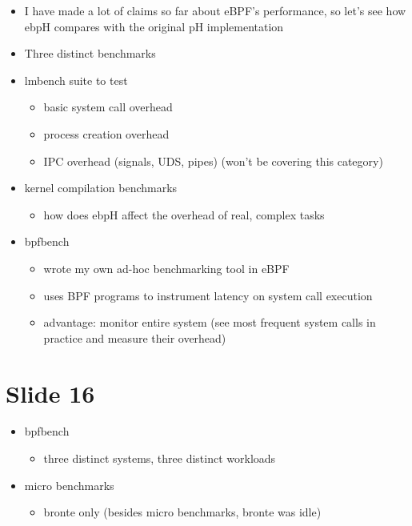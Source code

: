 \documentclass[
  12pt]{findlay}
\providecommand{\tightlist}{\setlength{\itemsep}{0pt}\setlength{\parskip}{0pt}}
\begin{document}
\begin{itemize}
\tightlist
\item
  I have made a lot of claims so far about eBPF's performance, so let's
  see how ebpH compares with the original pH implementation
\item
  Three distinct benchmarks
\item
  lmbench suite to test

  \begin{itemize}
  \tightlist
  \item
    basic system call overhead
  \item
    process creation overhead
  \item
    IPC overhead (signals, UDS, pipes) (won't be covering this category)
  \end{itemize}
\item
  kernel compilation benchmarks

  \begin{itemize}
  \tightlist
  \item
    how does ebpH affect the overhead of real, complex tasks
  \end{itemize}
\item
  bpfbench

  \begin{itemize}
  \tightlist
  \item
    wrote my own ad-hoc benchmarking tool in eBPF
  \item
    uses BPF programs to instrument latency on system call execution
  \item
    advantage: monitor entire system (see most frequent system calls in
    practice and measure their overhead)
  \end{itemize}
\end{itemize}

\hypertarget{slide-16}{%
\section{Slide 16}\label{slide-16}}

\begin{itemize}
\tightlist
\item
  bpfbench

  \begin{itemize}
  \tightlist
  \item
    three distinct systems, three distinct workloads
  \end{itemize}
\item
  micro benchmarks

  \begin{itemize}
  \tightlist
  \item
    bronte only (besides micro benchmarks, bronte was idle)
  \end{itemize}
\end{itemize}
\end{document}
